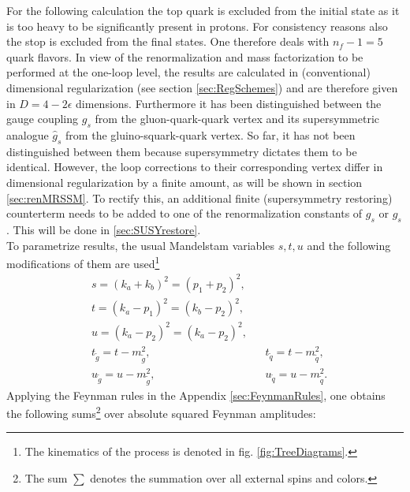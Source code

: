 For the following calculation the top quark is excluded from the initial state as it is too heavy to be significantly present in protons. %
For consistency reasons also the stop is excluded from the final states. One therefore deals with $n_f-1 = 5$ quark flavors. In view of the renormalization and mass factorization to be performed at the one-loop level, the results are calculated in (conventional) dimensional regularization (see section \ref{sec:RegSchemes}) and are therefore given in $D = 4 - 2\epsilon$ dimensions. Furthermore it has been distinguished between the gauge coupling $g_s$ from the gluon-quark-quark vertex and its supersymmetric analogue $\hat{g}_s$ from the gluino-squark-quark vertex. So far, it has not been distinguished between them because supersymmetry dictates them to be identical. However, the loop corrections to their corresponding vertex differ in dimensional regularization by a finite amount, as will be shown in section \ref{sec:renMRSSM}. To rectify this, an additional finite (supersymmetry restoring) counterterm needs to be added to one of the renormalization constants of $g_s$ or $\hat{g}_s$. This will be done in \ref{sec:SUSYrestore}.\\
To parametrize results, the usual Mandelstam variables $s,t,u$ and the following modifications of them are used\footnote{The kinematics of the process is denoted in fig. \ref{fig:TreeDiagrams}.}
\begin{align}
& s = (k_a + k_b)^2 = (p_1 + p_2)^2,\nonumber\\
& t = (k_a - p_1)^2 = (k_b - p_2)^2,\nonumber\\
& u = (k_a - p_2)^2 = (k_a - p_2)^2,\nonumber\\
& t_{\tilde{g}} = t - m_{\tilde{g}}^2, && t_{\tilde{q}} = t- m_{\tilde{q}}^2,\nonumber\\
& u_{\tilde{g}} = u - m_{\tilde{g}}^2, && u_{\tilde{q}} = u- m_{\tilde{q}}^2.
\end{align}
Applying the Feynman rules in the Appendix \ref{sec:FeynmanRules}, one obtains the following sums\footnote{The sum $\sum$ denotes the summation over all external spins and colors.} over absolute squared Feynman amplitudes:
